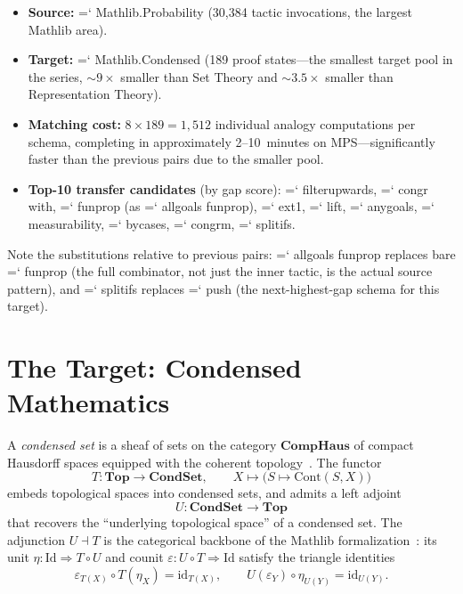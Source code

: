 \documentclass[11pt]{article}
\renewcommand{\texttt}[1]{%
  \begingroup\ttfamily\hyphenchar\font=`\-\relax
  \def\_{\textunderscore\discretionary{}{}{}}%
  #1\endgroup}
\theoremstyle{definition}
\theoremstyle{remark}
\begin{document}
\begin{itemize}
\item \textbf{Source:} \texttt{Mathlib.Probability} (30{,}384 tactic
  invocations, the largest Mathlib area).
\item \textbf{Target:} \texttt{Mathlib.Condensed} (189 proof
  states---the smallest target pool in the series, ${\sim}9\times$
  smaller than Set Theory and ${\sim}3.5\times$ smaller than
  Representation Theory).
\item \textbf{Matching cost:} $8 \times 189 = 1{,}512$
  individual analogy computations per schema, completing in
  approximately 2--10~minutes on MPS---significantly faster
  than the previous pairs due to the smaller pool.
\item \textbf{Top-10 transfer candidates} (by gap score):
  \texttt{filter\_upwards}, \texttt{congr\,with}, \texttt{fun\_prop}
  (as \texttt{all\_goals fun\_prop}), \texttt{ext1},
  \texttt{lift}, \texttt{any\_goals},
  \texttt{measurability}, \texttt{by\_cases}, \texttt{congrm},
  \texttt{split\_ifs}.
\end{itemize}

Note the substitutions relative to previous pairs:
\texttt{all\_goals fun\_prop} replaces bare \texttt{fun\_prop}
(the full combinator, not just the inner tactic, is the
actual source pattern), and \texttt{split\_ifs} replaces
\texttt{push} (the next-highest-gap schema for this target).

\section{The Target: Condensed Mathematics}\label{sec:target}

A \emph{condensed set} is a sheaf of sets on the category
$\mathbf{CompHaus}$ of compact Hausdorff spaces equipped with the
coherent topology~\cite{scholze_condensed_2019}.  The functor
\[
  T \colon \mathbf{Top} \longrightarrow \mathbf{CondSet},
  \qquad
  X \longmapsto \bigl(S \mapsto \mathrm{Cont}(S, X)\bigr)
\]
embeds topological spaces into condensed sets, and admits a left
adjoint
\[
  U \colon \mathbf{CondSet} \longrightarrow \mathbf{Top}
\]
that recovers the ``underlying topological space'' of a condensed
set.  The adjunction $U \dashv T$ is the categorical backbone of the
Mathlib formalization~\cite{asgeirsson_condensed_2024}: its unit
$\eta \colon \mathrm{Id} \Rightarrow T \circ U$ and counit
$\varepsilon \colon U \circ T \Rightarrow \mathrm{Id}$ satisfy the
triangle identities
\begin{equation}\label{eq:triangle}
  \varepsilon_{T(X)} \circ T(\eta_X) = \mathrm{id}_{T(X)},
  \qquad
  U(\varepsilon_Y) \circ \eta_{U(Y)} = \mathrm{id}_{U(Y)}.
\end{equation}
\end{document}
